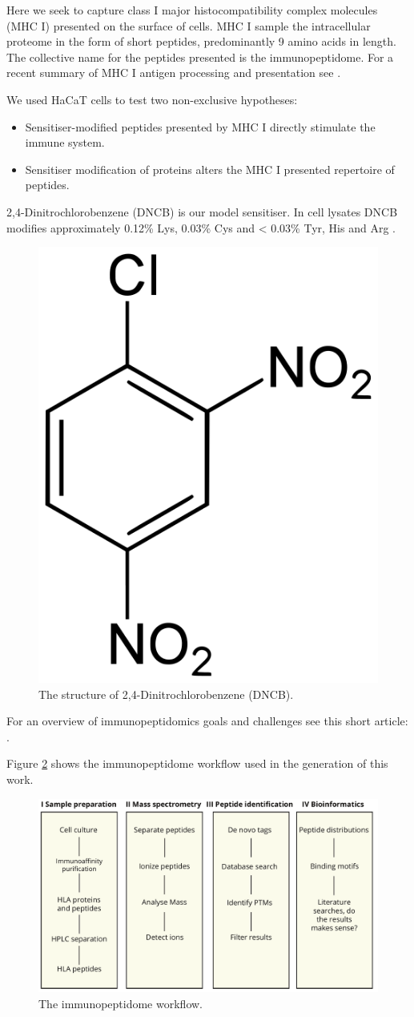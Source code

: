 \documentclass[12pt,]{book}
\begin{document}
Here we seek to capture class I major histocompatibility complex
molecules (MHC I) presented on the surface of cells. MHC I sample the
intracellular proteome in the form of short peptides, predominantly 9
amino acids in length. The collective name for the peptides presented is
the immunopeptidome. For a recent summary of MHC I antigen processing
and presentation see \citep{hateren2017a}.

We used HaCaT cells to test two non-exclusive hypotheses:

\begin{itemize}
\item
  Sensitiser-modified peptides presented by MHC I directly stimulate the
  immune system.
\item
  Sensitiser modification of proteins alters the MHC I presented
  repertoire of peptides.
\end{itemize}

2,4-Dinitrochlorobenzene (DNCB) is our model sensitiser. In cell lysates
DNCB modifies approximately 0.12\% Lys, 0.03\% Cys and \textless{}
0.03\% Tyr, His and Arg \citep{parkinson2018}.



\begin{figure}

{\centering \includegraphics[width=0.15\linewidth]{img/DNCB} 

}

\caption{The structure of 2,4-Dinitrochlorobenzene (DNCB).}\label{fig:dncb}
\end{figure}

For an overview of immunopeptidomics goals and challenges see this short
article: \citep{caron2017}.

Figure \ref{fig:workflow} shows the immunopeptidome workflow used in the
generation of this work.



\begin{figure}

{\centering \includegraphics{img/mass_spec_summary} 

}

\caption{The immunopeptidome workflow.}\label{fig:workflow}
\end{figure}
\end{document}
